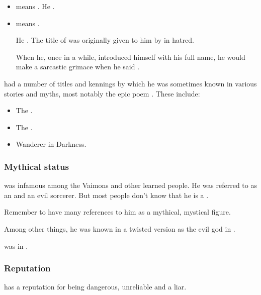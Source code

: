 \begin{itemize}
  \item 
    \quo{\Nierzshah} means .
    He . 
  \item 
    \quo{\Tzeorossh} means .
    
    He . 
    The title of  was originally given to him by \Secherdamon in hatred.
    
    When he, once in a while, introduced himself with his full name, he would make a sarcastic grimace when he said \quo{\Tzeorossh}.
\end{itemize}

\Ishnaruchaefir{} had a number of titles and kennings by which he was sometimes known in various stories and myths, most notably the epic poem \emph{}. 
These include:

\begin{itemize}
  \item The .
  \item The .
  \item Wanderer in Darkness. 
\end{itemize}






\subsubsection{Mythical status}
\Ishnaruchaefir{} was infamous among the Vaimons and other learned people. 
He was referred to as an  and an evil \chaos{} sorcerer. 
But most people don't know that he is a \dragon. 

Remember to have many references to him as a mythical, mystical figure. 

Among other things, he was known in a twisted version as the evil god  in .

\Ishnaruchaefir was  in .





\subsubsection{Reputation}
\Ishnaruchaefir{} has a reputation for being dangerous, unreliable and a liar. 

